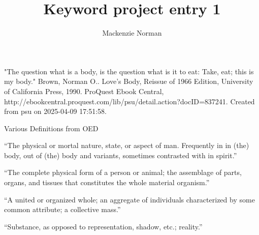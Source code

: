 \documentclass{article}
\title{Keyword project entry 1}
\author{Mackenzie Norman}
\begin{document}
"The question what is a body, is the question what is it to eat: Take, eat; this is my body."
Brown, Norman O.. Love's Body, Reissue of 1966 Edition, University of California Press, 1990. ProQuest Ebook Central, http://ebookcentral.proquest.com/lib/psu/detail.action?docID=837241.
Created from psu on 2025-04-09 17:51:58.





Various Definitions from OED

``The physical or mortal nature, state, or aspect of man. Frequently in in (the) body, out of (the) body and variants, sometimes contrasted with in spirit.''

``The complete physical form of a person or animal; the assemblage of parts, organs, and tissues that constitutes the whole material organism.''

``A united or organized whole; an aggregate of individuals characterized by some common attribute; a collective mass.''

``Substance, as opposed to representation, shadow, etc.; reality.''
\end{document}

